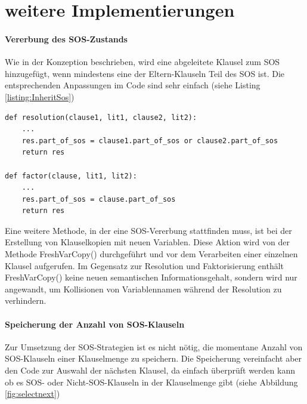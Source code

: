 \section{weitere Implementierungen}
\label{section:weitereImpl}

\paragraph{Vererbung des SOS-Zustands}
Wie in der Konzeption beschrieben, wird eine abgeleitete Klausel zum SOS hinzugefügt, wenn mindestens eine der Eltern-Klauseln Teil des SOS ist. Die entsprechenden Anpassungen im Code sind sehr einfach (siehe Listing \ref{listing:InheritSos})
\begin{lstlisting}[caption={Implementierung der Vererbung des SOS.Zustands an abgeleitee Klauseln}, label={listing:InheritSos}]
def resolution(clause1, lit1, clause2, lit2):
	...
	res.part_of_sos = clause1.part_of_sos or clause2.part_of_sos
	return res
	
def factor(clause, lit1, lit2):
	...
	res.part_of_sos = clause.part_of_sos
	return res
\end{lstlisting}
Eine weitere Methode, in der eine SOS-Vererbung stattfinden muss, ist bei der Erstellung von Klauselkopien mit neuen Variablen. Diese Aktion wird von der Methode FreshVarCopy() durchgeführt und vor dem Verarbeiten einer einzelnen Klausel aufgerufen.
Im Gegensatz zur Resolution und Faktorisierung enthält FreshVarCopy() keine neuen semantischen Informationsgehalt, sondern wird nur angewandt, um Kollisionen von Variablennamen während der Resolution zu verhindern.


\paragraph{Speicherung der Anzahl von SOS-Klauseln}
Zur Umsetzung der SOS-Strategien ist es nicht nötig, die momentane Anzahl von SOS-Klauseln einer Klauselmenge zu speichern. Die Speicherung vereinfacht aber den Code zur Auswahl der nächsten Klausel, da einfach überprüft werden kann ob es SOS- oder Nicht-SOS-Klauseln in der Klauselmenge gibt (siehe Abbildung \ref{fig:selectnext})

